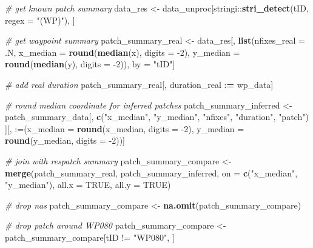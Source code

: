 \documentclass[
]{scrartcl}
\newenvironment{Shaded}{}{}
\newcommand{\CommentTok}[1]{\textcolor[rgb]{0.38,0.63,0.69}{\textit{#1}}}
\newcommand{\DataTypeTok}[1]{\textcolor[rgb]{0.56,0.13,0.00}{#1}}
\newcommand{\DecValTok}[1]{\textcolor[rgb]{0.25,0.63,0.44}{#1}}
\newcommand{\ErrorTok}[1]{\textcolor[rgb]{1.00,0.00,0.00}{\textbf{#1}}}
\newcommand{\KeywordTok}[1]{\textcolor[rgb]{0.00,0.44,0.13}{\textbf{#1}}}
\newcommand{\NormalTok}[1]{#1}
\newcommand{\OperatorTok}[1]{\textcolor[rgb]{0.40,0.40,0.40}{#1}}
\newcommand{\OtherTok}[1]{\textcolor[rgb]{0.00,0.44,0.13}{#1}}
\newcommand{\StringTok}[1]{\textcolor[rgb]{0.25,0.44,0.63}{#1}}
\begin{document}
\begin{Shaded}
\begin{Highlighting}[]
\CommentTok{\# get known patch summary}
\NormalTok{data\_res <{-}}\StringTok{ }\NormalTok{data\_unproc[stringi}\OperatorTok{::}\KeywordTok{stri\_detect}\NormalTok{(tID, }\DataTypeTok{regex =} \StringTok{"(WP)"}\NormalTok{), ]}

\CommentTok{\# get waypoint summary}
\NormalTok{patch\_summary\_real <{-}}\StringTok{ }\NormalTok{data\_res[, }\KeywordTok{list}\NormalTok{(}\DataTypeTok{nfixes\_real =}\NormalTok{ .N,}
                                      \DataTypeTok{x\_median =} \KeywordTok{round}\NormalTok{(}\KeywordTok{median}\NormalTok{(x), }\DataTypeTok{digits =} \DecValTok{{-}2}\NormalTok{),}
                                      \DataTypeTok{y\_median =} \KeywordTok{round}\NormalTok{(}\KeywordTok{median}\NormalTok{(y), }\DataTypeTok{digits =} \DecValTok{{-}2}\NormalTok{)), }
\NormalTok{                               by =}\StringTok{ "tID"}\NormalTok{]}

\CommentTok{\# add real duration}
\NormalTok{patch\_summary\_real[, duration\_real }\OperatorTok{:}\ErrorTok{=}\StringTok{ }\NormalTok{wp\_data]}

\CommentTok{\# round median coordinate for inferred patches}
\NormalTok{patch\_summary\_inferred <{-}}\StringTok{ }
\StringTok{  }\NormalTok{patch\_summary\_data[, }
                     \KeywordTok{c}\NormalTok{(}\StringTok{"x\_median"}\NormalTok{, }\StringTok{"y\_median"}\NormalTok{, }
                       \StringTok{"nfixes"}\NormalTok{, }\StringTok{"duration"}\NormalTok{, }\StringTok{"patch"}\NormalTok{)}
\NormalTok{                     ][, }\StringTok{\textasciigrave{}}\DataTypeTok{:=}\StringTok{\textasciigrave{}}\NormalTok{(}\DataTypeTok{x\_median =} \KeywordTok{round}\NormalTok{(x\_median, }\DataTypeTok{digits =} \DecValTok{{-}2}\NormalTok{),}
                              \DataTypeTok{y\_median =} \KeywordTok{round}\NormalTok{(y\_median, }\DataTypeTok{digits =} \DecValTok{{-}2}\NormalTok{))]}

\CommentTok{\# join with respatch summary}
\NormalTok{patch\_summary\_compare <{-}}\StringTok{ }
\StringTok{  }\KeywordTok{merge}\NormalTok{(patch\_summary\_real,}
\NormalTok{        patch\_summary\_inferred, }
        \DataTypeTok{on =} \KeywordTok{c}\NormalTok{(}\StringTok{"x\_median"}\NormalTok{, }\StringTok{"y\_median"}\NormalTok{),}
        \DataTypeTok{all.x =} \OtherTok{TRUE}\NormalTok{, }\DataTypeTok{all.y =} \OtherTok{TRUE}\NormalTok{)}

\CommentTok{\# drop nas}
\NormalTok{patch\_summary\_compare <{-}}\StringTok{ }\KeywordTok{na.omit}\NormalTok{(patch\_summary\_compare)}

\CommentTok{\# drop patch around WP080}
\NormalTok{patch\_summary\_compare <{-}}\StringTok{ }\NormalTok{patch\_summary\_compare[tID }\OperatorTok{!=}\StringTok{ "WP080"}\NormalTok{, ]}
\end{Highlighting}
\end{Shaded}
\end{document}
